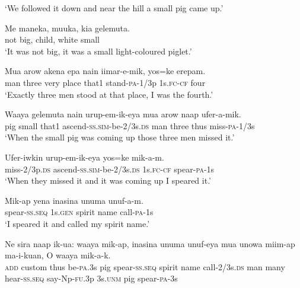 {\glt ‘We followed it down and near the hill a small pig came up.’ \\
\z


\ea\label{ex:a:x12}
\gll  Me  maneka,  muuka,  kia  gelemuta. \\
not  big,  child,  white  small \\
\glt ‘It was not big, it was a small light-coloured piglet.’ \\
\z


\ea\label{ex:a:x13}
\gll  Mua  arow  akena  epa  nain  iimar-e-mik,  yos=ke  erepam. \\
man  three  very  place  that1  stand-\textsc{pa}-1/3p  1s.\textsc{fc}-\textsc{cf}  four \\
\glt ‘Exactly three men stood at that place, I was the fourth.’ \\
\z


\ea\label{ex:a:x14}
\gll  Waaya  gelemuta  nain  urup-em-ik-eya  mua  arow  naap  ufer-a-mik. \\
pig  small  that1  ascend-\textsc{ss}.\textsc{sim}-be-2/3s.\textsc{ds}  man  three  thus  miss-\textsc{pa}-1/3s \\
\glt ‘When the small pig was coming up those three men missed it.’ \\
\z


\ea\label{ex:a:x15}
\gll  Ufer-iwkin  urup-em-ik-eya  yos=ke  mik-a-m. \\
miss-2/3p.\textsc{ds}  ascend-\textsc{ss}.\textsc{sim}-be-2/3s.\textsc{ds}  1s.\textsc{fc}-\textsc{cf}  spear-\textsc{pa}-1s \\
\glt ‘When they missed it and it was coming up I speared it.’ \\
\z


\ea\label{ex:a:x16}
\gll  Mik-ap  yena  inasina  unuma  unuf-a-m. \\
spear-\textsc{ss.seq}  1s.\textsc{gen}  spirit  name  call-\textsc{pa}-1s \\
\glt ‘I speared it and called my spirit name.’ \\
\z


\ea\label{ex:a:x17}
\gll  Ne  sira  naap  ik-ua:  waaya  mik-ap,  inasina  unuma  unuf-eya         mua  unowa  miim-ap  ma-i-kuan,  {\textquotedbl}O  waaya  mik-a-k.{\textquotedbl} \\
\textsc{add}  custom  thus  be-\textsc{pa}.3s  pig  spear-\textsc{ss.seq}  spirit  name  call-2/3s.\textsc{ds}     man  many  hear-\textsc{ss.seq}  say-Np-\textsc{fu}.3p  3s.\textsc{unm}  pig  spear-\textsc{pa}-3s \\


}
